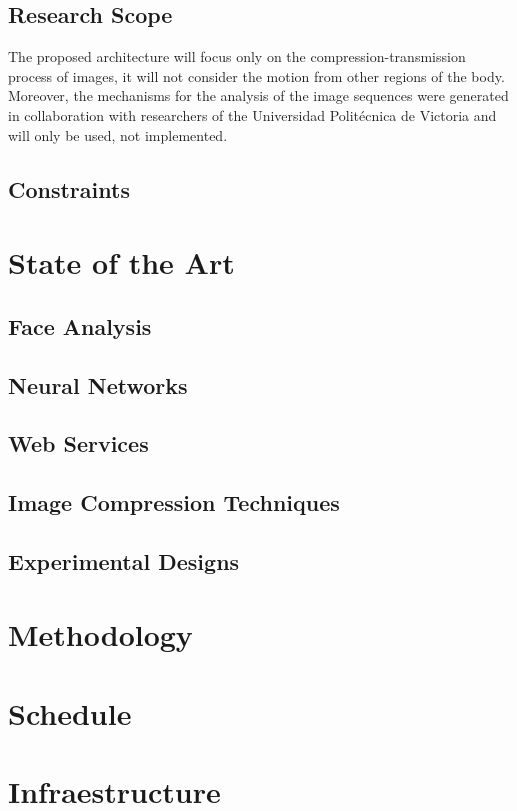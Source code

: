 \documentclass[12pt,letterpaper,titlepage]{article}
\begin{document}
\subsection{Research Scope}
The proposed architecture will focus only on the compression-transmission process of images, it will not consider the motion from other regions of the body. Moreover, the mechanisms for the analysis of the image sequences were generated in collaboration with researchers of the Universidad Polit\'ecnica de Victoria and will only be used, not implemented.

\subsection{Constraints}

\newpage
\section{State of the Art}
\subsection{Face Analysis}
	
\subsection{Neural Networks}
	
\subsection{Web Services}
	
\subsection{Image Compression Techniques}
\subsection{Experimental Designs}

\clearpage
\section{Methodology}
\section{Schedule}
\newpage
\section{Infraestructure}

\newpage

%

\end{document}
